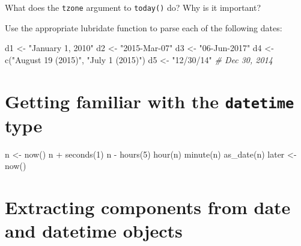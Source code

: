 \documentclass[
]{book}
\newenvironment{Shaded}{\begin{snugshade}}{\end{snugshade}}
\newcommand{\CommentTok}[1]{\textcolor[rgb]{0.56,0.35,0.01}{\textit{#1}}}
\newcommand{\DecValTok}[1]{\textcolor[rgb]{0.00,0.00,0.81}{#1}}
\newcommand{\FunctionTok}[1]{\textcolor[rgb]{0.00,0.00,0.00}{#1}}
\newcommand{\NormalTok}[1]{#1}
\newcommand{\OtherTok}[1]{\textcolor[rgb]{0.56,0.35,0.01}{#1}}
\newcommand{\SpecialCharTok}[1]{\textcolor[rgb]{0.00,0.00,0.00}{#1}}
\newcommand{\StringTok}[1]{\textcolor[rgb]{0.31,0.60,0.02}{#1}}
\begin{document}
What does the \texttt{tzone} argument to \texttt{today()} do? Why is it important?

Use the appropriate lubridate function to parse each of the following dates:

\begin{Shaded}
\begin{Highlighting}[]
\NormalTok{d1 }\OtherTok{\textless{}{-}} \StringTok{"January 1, 2010"}
\NormalTok{d2 }\OtherTok{\textless{}{-}} \StringTok{"2015{-}Mar{-}07"}
\NormalTok{d3 }\OtherTok{\textless{}{-}} \StringTok{"06{-}Jun{-}2017"}
\NormalTok{d4 }\OtherTok{\textless{}{-}} \FunctionTok{c}\NormalTok{(}\StringTok{"August 19 (2015)"}\NormalTok{, }\StringTok{"July 1 (2015)"}\NormalTok{)}
\NormalTok{d5 }\OtherTok{\textless{}{-}} \StringTok{"12/30/14"} \CommentTok{\# Dec 30, 2014}
\end{Highlighting}
\end{Shaded}

\hypertarget{getting-familiar-with-the-datetime-type}{%
\section*{\texorpdfstring{Getting familiar with the \texttt{datetime} type}{Getting familiar with the datetime type}}\label{getting-familiar-with-the-datetime-type}}

\begin{Shaded}
\begin{Highlighting}[]
\NormalTok{n }\OtherTok{\textless{}{-}} \FunctionTok{now}\NormalTok{() }
\NormalTok{n }\SpecialCharTok{+} \FunctionTok{seconds}\NormalTok{(}\DecValTok{1}\NormalTok{)}
\NormalTok{n }\SpecialCharTok{{-}} \FunctionTok{hours}\NormalTok{(}\DecValTok{5}\NormalTok{)}
\FunctionTok{hour}\NormalTok{(n)}
\FunctionTok{minute}\NormalTok{(n)}
\FunctionTok{as\_date}\NormalTok{(n)}
\NormalTok{later }\OtherTok{\textless{}{-}} \FunctionTok{now}\NormalTok{()}
\end{Highlighting}
\end{Shaded}

\hypertarget{extracting-components-from-date-and-datetime-objects}{%
\section*{Extracting components from date and datetime objects}\label{extracting-components-from-date-and-datetime-objects}}
\end{document}
